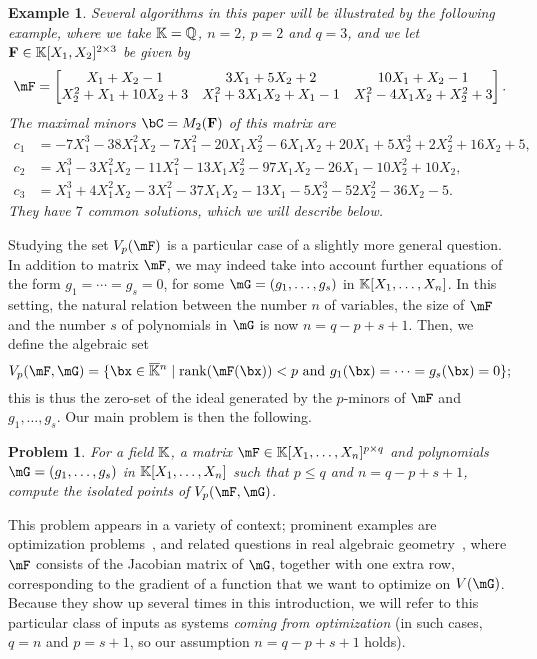 \documentclass[12pt]{article}
\newtheorem{pbm}{Problem}
\newtheorem{example}[definition]{Example}
\begin{document}
\begin{example}\label{ex:1}
  Several algorithms in this paper will be illustrated by the following example,
  where we take $\mathbb{K}=\mathbb{Q}$, $n=2$, $p=2$ and $q=3$, and we let $\mathbf{F} \in \mathbb{K}[X_1,X_2]^{2 \times 3}$ 
  be given by 
  $$\mF=\begin{bmatrix}
  X_1+X_2-1 & 3X_1+5X_2+2  & 10X_1+X_2-1\\
  X_2^2+X_1+10X_2+3   & X_1^2+3X_1X_2+X_1-1  & X_1^2-4X_1X_2+X_2^2+3
  \end{bmatrix}.$$
  The maximal minors $\bC=M_2(\F)$ of this matrix are
  \begin{align*}
   c_1&= -7X_1^3 - 38X_1^2X_2 - 7X_1^2 - 20X_1X_2^2 - 6X_1X_2 + 20X_1 + 5X_2^3 +    2X_2^2 + 16X_2 + 5,\\
   c_2&=    X_1^3 - 3X_1^2X_2 - 11X_1^2 - 13X_1X_2^2 - 97X_1X_2 - 26X_1 - 10X_2^2 +    10X_2,\\
   c_3&=    X_1^3 + 4X_1^2X_2 - 3X_1^2 - 37X_1X_2 - 13X_1 - 5X_2^3 - 52X_2^2 - 36X_2 - 5.
  \end{align*}
  They have $7$ common solutions, which we will describe below.
\end{example}



Studying the set $\VpF{p}{\mF}$ is a particular case of a slightly
more general question. In addition to matrix $\mF$, we may indeed take
into account further equations of the form $g_1 =\cdots=g_s=0$, for
some $\mG=(g_1,\dots,g_s)$ in $\mathbb{K}[X_1,\dots,X_n]$. In this setting, the
natural relation between the number $n$ of variables, the size of
$\mF$ and the number $s$ of polynomials in $\mG$ is now
$n=q-p+s+1$. Then, we define the algebraic set
$$\VpFG{p}{\mF}{\mG} = \{\bx \in \KKbar{}^n \mid
\mathrm{rank}(\mF({\bx})) < p \text{~and~} g_1(\bx)=\cdots=g_s(\bx)=0
\};$$ this is thus the zero-set of the ideal generated by the
$p$-minors of $\mF$ and $ g_1,\dots,g_s$. Our main problem is then the following.
\begin{pbm} \label{problem2} 
  For a field $\mathbb{K}$, a matrix $\mF \in \KK[X_1,\dots,X_n]^{p \times q}$ and
  polynomials $\mG=(g_1,\dots,g_s)$ in $\mathbb{K}[X_1,\dots,X_n]$ such that 
  $p \leq q$ and   $n = q-p+s+1$, compute the isolated points of $\VpFG{p}{\mF}{\mG}$.
\end{pbm}
This problem appears in a variety of context; prominent examples are
optimization problems~\cite{GSZ10,JP14,BGHS14,GS14,NDS06}, and related
questions in real algebraic
geometry~\cite{ARS,BaGiHeMb01,BaGiHePa05,BGHSS,BRSS,RealDecompICMS,CellDecompSurface,BertiniReal,RealNumerical,SaSc03,SaSc11,SaSc17},
where $\mF$ consists of the Jacobian matrix of $\mG$, together with
one extra row, corresponding to the gradient of a function that we
want to optimize on $V(\mG)$. Because they show up several times in
this introduction, we will refer to this particular class of inputs as
systems {\em coming from optimization} (in such cases, $q=n$ and $p=s+1$, 
so our assumption $n=q-p+s+1$ holds).
\end{document}

